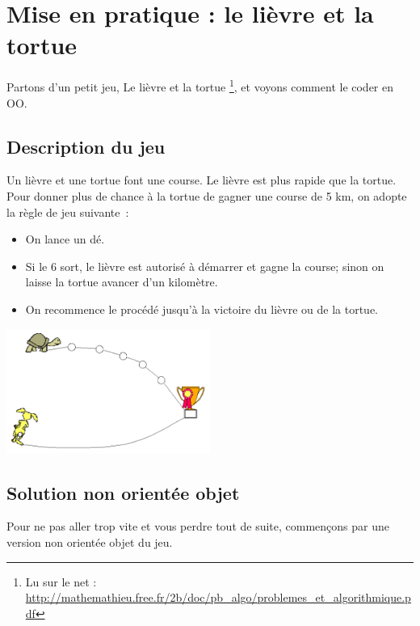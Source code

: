 \clearpage	
\section{Mise en pratique : le lièvre et la tortue}

	Partons d'un petit jeu, \og{}Le lièvre et la tortue\fg{}%
	\footnote{%
		Lu sur le net : 
		\url{http://mathemathieu.free.fr/2b/doc/pb_algo/problemes_et_algorithmique.pdf}
	}, 
	et voyons comment le coder en OO.

	\subsection{Description du jeu}
	
		Un lièvre et une tortue font une course.
		Le lièvre est plus rapide que la tortue.
		Pour donner plus de chance à la tortue de gagner une course de 5 km, 
		on adopte la règle de jeu suivante~:
		\begin{itemize}
		\item 
			On lance un dé. 
		\item
			Si le 6 sort, 
			le lièvre est autorisé à démarrer et gagne la course; 
			sinon on laisse la tortue avancer d’un kilomètre.
		\item
			On recommence le procédé jusqu'à la victoire du lièvre ou de la tortue.
		\end{itemize}
		
		\begin{center}
			\includegraphics[width=0.5\textwidth]{image/lievre-tortue}
		\end{center}
		
	\subsection{Solution non orientée objet}
	
		Pour ne pas aller trop vite et vous perdre tout de suite,
		commençons par une version non orientée objet du jeu.
		
